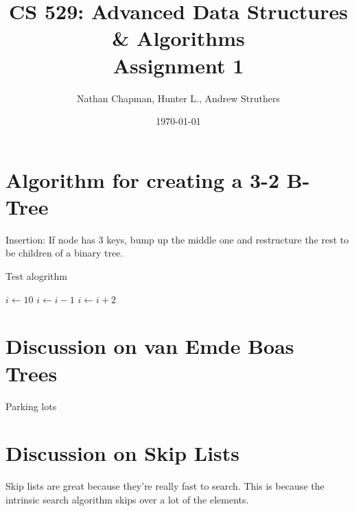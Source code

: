 \documentclass{article}
\title{CS 529: Advanced Data Structures \& Algorithms \\ Assignment 1}
\author{Nathan Chapman, Hunter L., Andrew Struthers}
\date{\today}
\begin{document}
\maketitle

\section*{Algorithm for creating a 3-2 B-Tree}

    Insertion: If node has 3 keys, bump up the middle one and restructure the rest to be children of a binary tree.

    Test alogrithm
    \begin{algorithm}
        $i\gets 10$\;
        {
            $i\gets i-1$\;
        }{
            {
                $i\gets i+2$\;
            }
        }
    \end{algorithm}

\pagebreak

\section*{Discussion on van Emde Boas Trees}

    Parking lots

\pagebreak

\section*{Discussion on Skip Lists}

    Skip lists are great because they're really fast to search.  This is because the intrinsic search algorithm skips over a lot of the elements.

\pagebreak
\end{document}
